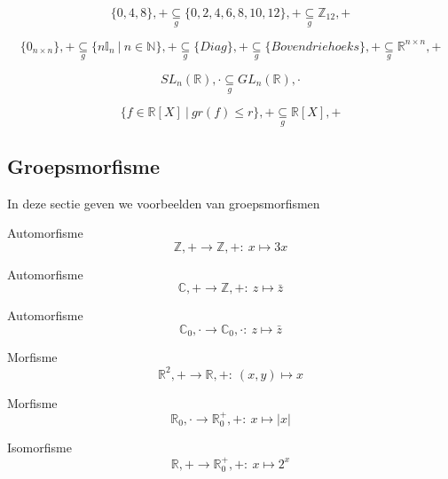 \documentclass[main.tex]{subfiles}
\begin{document}
\begin{vb}
  \[ \{ 0,4,8\},+ \underset{g}{\subseteq} \{ 0,2,4,6,8,10,12\},+ \underset{g}{\subseteq} \mathbb{Z}_{12},+ \]
\end{vb}

\begin{vb}
  \[ \{0_{n\times n}\},+ \underset{g}{\subseteq} \{ n\mathbb{I}_{n} \ |\ n \in \mathbb{N} \},+ \underset{g}{\subseteq} \{ Diag \},+ \underset{g}{\subseteq} \{ Bovendriehoeks \},+ \underset{g}{\subseteq} \mathbb{R}^{n\times n},+ \]
\end{vb}

\begin{vb}
  \[ SL_{n}(\mathbb{R}),\cdot \underset{g}{\subseteq} GL_{n}(\mathbb{R}),\cdot \]
\end{vb}

\begin{vb}
  \[ \{f \in \mathbb{R}[X] \ |\ gr(f) \le r\},+ \underset{g}{\subseteq} \mathbb{R}[X],+ \]
\end{vb} 

\subsection{Groepsmorfisme}


In deze sectie geven we voorbeelden van groepsmorfismen

\begin{vb}
  Automorfisme
  \[ \mathbb{Z},+ \rightarrow \mathbb{Z},+:\ x \mapsto 3x \]
\end{vb}

\begin{vb}
  Automorfisme
  \[ \mathbb{C},+ \rightarrow \mathbb{Z},+:\ z \mapsto \bar{z} \]
\end{vb}

\begin{vb}
  Automorfisme
  \[ \mathbb{C}_{0},\cdot \rightarrow \mathbb{C}_{0},\cdot:\ z \mapsto \bar{z} \]
\end{vb}

\begin{vb}
  Morfisme
  \[ \mathbb{R}^{2},+ \rightarrow \mathbb{R},+:\ (x,y) \mapsto x \]
\end{vb}

\begin{vb}
  Morfisme
  \[ \mathbb{R}_{0},\cdot \rightarrow \mathbb{R}^{+}_{0},+:\ x \mapsto |x| \]
\end{vb}

\begin{vb}
  Isomorfisme
  \[ \mathbb{R},+ \rightarrow \mathbb{R}^{+}_{0},+:\ x \mapsto 2^{x} \]
\end{vb}
\end{document}
